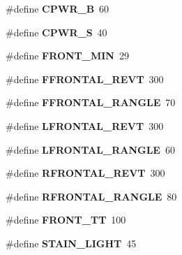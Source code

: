 \begin{DoxyCompactItemize}
\item 
\hypertarget{calibrate_8nxc_a738b9657b067e383cd066d4c7ca6f576}{
\#define {\bfseries CPWR\_\-B}~60}
\label{calibrate_8nxc_a738b9657b067e383cd066d4c7ca6f576}

\item 
\hypertarget{calibrate_8nxc_ae382ea7d9a3437076c5616056836377a}{
\#define {\bfseries CPWR\_\-S}~40}
\label{calibrate_8nxc_ae382ea7d9a3437076c5616056836377a}

\item 
\hypertarget{calibrate_8nxc_ac9341f36c8b85c8d70f06973c2d9a5bd}{
\#define {\bfseries FRONT\_\-MIN}~29}
\label{calibrate_8nxc_ac9341f36c8b85c8d70f06973c2d9a5bd}

\item 
\hypertarget{calibrate_8nxc_acb1164349a1fa4b7052e28f7c7c735d4}{
\#define {\bfseries FFRONTAL\_\-REVT}~300}
\label{calibrate_8nxc_acb1164349a1fa4b7052e28f7c7c735d4}

\item 
\hypertarget{calibrate_8nxc_abda398fa4722b8691dc8c52c733a2814}{
\#define {\bfseries FFRONTAL\_\-RANGLE}~70}
\label{calibrate_8nxc_abda398fa4722b8691dc8c52c733a2814}

\item 
\hypertarget{calibrate_8nxc_aac0491bc7a39228e57b85de235ef59eb}{
\#define {\bfseries LFRONTAL\_\-REVT}~300}
\label{calibrate_8nxc_aac0491bc7a39228e57b85de235ef59eb}

\item 
\hypertarget{calibrate_8nxc_ad19631fb45582ad9441719c376c07c3b}{
\#define {\bfseries LFRONTAL\_\-RANGLE}~60}
\label{calibrate_8nxc_ad19631fb45582ad9441719c376c07c3b}

\item 
\hypertarget{calibrate_8nxc_a623033e48068d57555d513a2d56d0c40}{
\#define {\bfseries RFRONTAL\_\-REVT}~300}
\label{calibrate_8nxc_a623033e48068d57555d513a2d56d0c40}

\item 
\hypertarget{calibrate_8nxc_a70438bca69ec65d9a29a9f120922464d}{
\#define {\bfseries RFRONTAL\_\-RANGLE}~80}
\label{calibrate_8nxc_a70438bca69ec65d9a29a9f120922464d}

\item 
\hypertarget{calibrate_8nxc_a7861c2174f24a87c43840f87f3cf8a14}{
\#define {\bfseries FRONT\_\-TT}~100}
\label{calibrate_8nxc_a7861c2174f24a87c43840f87f3cf8a14}

\item 
\hypertarget{calibrate_8nxc_abac7e3cf78ac568c0622e8497156baf1}{
\#define {\bfseries STAIN\_\-LIGHT}~45}
\label{calibrate_8nxc_abac7e3cf78ac568c0622e8497156baf1}


\end{DoxyCompactItemize}
